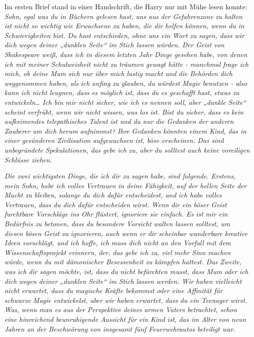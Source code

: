 {Im ersten Brief stand in einer Handschrift, die Harry nur mit Mühe lesen konnte: \emph{Sohn, egal was du in Büchern gelesen hast, uns aus der Gefahrenzone zu halten ist nicht so wichtig wie Erwachsene zu haben, die dir helfen können, wenn du in Schwierigkeiten bist. Du hast entschieden, ohne uns ein Wort zu sagen, dass wir dich wegen deiner „dunklen Seite“ im Stich lassen würden. Der Geist von Shakespeare weiß, dass ich in diesem letzten Jahr Dinge gesehen habe, von denen ich mit meiner Schulweisheit nicht zu träumen gewagt hätte - manchmal frage ich mich, ob deine Mum sich nur über mich lustig macht und die Behörden dich weggenommen haben, als ich anfing zu glauben, du würdest Magie benutzen - also kann ich nicht leugnen, dass es möglich ist, dass du es geschafft hast, etwas zu entwickeln… Ich bin mir nicht sicher, wie ich es nennen soll, aber „dunkle Seite“ scheint verfrüht, wenn wir nicht wissen, was los ist. Bist du sicher, dass es kein aufkeimendes telepathisches Talent ist und du nur die Gedanken der anderen Zauberer um dich herum aufnimmst? Ihre Gedanken könnten einem Kind, das in einer gesünderen Zivilisation aufgewachsen ist, böse erscheinen. Das sind unbegründete Spekulationen, das gebe ich zu, aber du solltest auch keine voreiligen Schlüsse ziehen.}

\emph{Die zwei wichtigsten Dinge, die ich dir zu sagen habe, sind folgende. Erstens, mein Sohn, habe ich volles Vertrauen in deine Fähigkeit, auf der hellen Seite der Macht zu bleiben, solange du dich dafür entscheidest, und ich habe volles Vertrauen, dass du dich dafür entscheiden wirst. Wenn dir ein böser Geist furchtbare Vorschläge ins Ohr flüstert, ignoriere sie einfach. Es ist mir ein Bedürfnis zu betonen, dass du besondere Vorsicht walten lassen solltest, um diesen bösen Geist zu ignorieren, auch wenn er dir scheinbar wunderbare kreative Ideen vorschlägt, und ich hoffe, ich muss dich nicht an den Vorfall mit dem Wissenschaftsprojekt erinnern, der, das gebe ich zu, viel mehr Sinn machen würde, wenn du mit dämonischer Besessenheit zu kämpfen hattest. Das Zweite, was ich dir sagen möchte, ist, dass du nicht befürchten musst, dass Mum oder ich dich wegen deiner „dunklen Seite“ im Stich lassen werden. Wir haben vielleicht nicht erwartet, dass du magische Kräfte bekommst oder eine Affinität für schwarze Magie entwickelst, aber wir haben erwartet, dass du ein Teenager wirst. Was, wenn man es aus der Perspektive deines armen Vaters betrachtet, schon eine hinreichend beunruhigende Aussicht für ein Kind ist, das im Alter von neun Jahren an der Beschwörung von insgesamt fünf Feuerwehrautos beteiligt war.}

}
